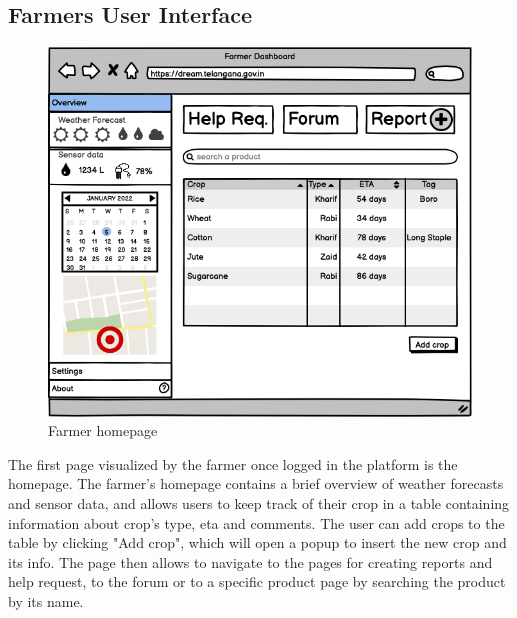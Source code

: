 \documentclass[10pt]{article} %
\begin{document}
\subsection{Farmers User Interface}
\begin{figure}[h]
    \centering
    \includegraphics[scale=0.4]{images/uimockups/f_homepage.png}
    \caption{Farmer homepage}
    \label{fig:ui_f_homepage}
\end{figure}
The first page visualized by the farmer once logged in the platform is the homepage. The farmer's homepage contains a brief overview of weather forecasts
and sensor data, and allows users to keep track of their crop in a table containing information about crop's type, eta and comments. The user can add crops 
to the table by clicking "Add crop", which will open a popup to insert the new crop and its info. The page then allows to navigate to the pages for creating reports
and help request, to the forum or to a specific product page by searching the product by its name.\\
\end{document}
